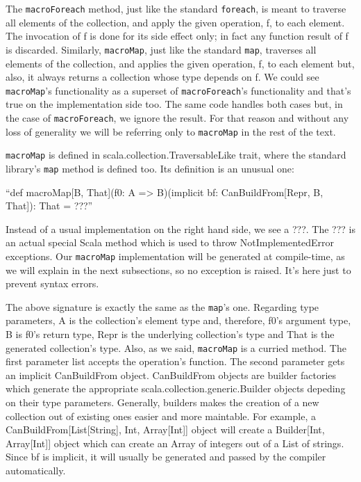 The \texttt{macroForeach} method, just like the standard \texttt{foreach}, is meant to traverse
all elements of the collection, and apply the given operation, f, to each
element. The invocation of f is done for its side effect only; in fact any
function result of f is discarded. Similarly, \texttt{macroMap}, just like the standard
\texttt{map}, traverses all elements of the collection, and applies the given operation,
f, to each element but, also, it always returns a collection whose type depends
on f. We could see \texttt{macroMap}'s functionality as a superset of \texttt{macroForeach}'s
functionality and that's true on the implementation side too. The same code
handles both cases but, in the case of \texttt{macroForeach}, we ignore the result. For
that reason and without any loss of generality we will be referring only to
\texttt{macroMap} in the rest of the text.

\texttt{macroMap} is defined in scala.collection.TraversableLike trait, where the
standard library's \texttt{map} method is defined too. Its definition is an unusual one:

``def macroMap[B, That](f0: A => B)(implicit bf: CanBuildFrom[Repr, B, That]):
That = ???''

Instead of a usual implementation on the right hand side, we see a ???. The ???
is an actual special Scala method which is used to throw NotImplementedError
exceptions. Our \texttt{macroMap} implementation will be generated at compile-time, as
we will explain in the next subsections, so no exception is raised. It's here
just to prevent syntax errors. 

The above signature is exactly the same as the \texttt{map}'s one. Regarding
type parameters, A is the collection's element type and, therefore, f0's
argument type, B is f0's return type, Repr is the underlying collection's type
and That is the generated collection's type. Also, as we said, \texttt{macroMap} is a
curried method. The first parameter list accepts the operation's function. The
second parameter gets an implicit CanBuildFrom object. CanBuildFrom objects are
builder factories which generate the appropriate
scala.collection.generic.Builder objects depeding on their type parameters.
Generally, builders makes the creation of a new collection out of existing ones
easier and more maintable. For example, a CanBuildFrom[List[String], Int,
Array[Int]] object will create a Builder[Int, Array[Int]] object which can
create an Array of integers out of a List of strings. Since bf is implicit, it
will usually be generated and passed by the compiler automatically.


